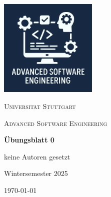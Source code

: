 \providecommand{\BlattNr}{0}
\providecommand{\AuthorsNames}{keine Autoren gesetzt}

\begin{titlepage}
	\centering
	\includegraphics[width=0.35\textwidth]{../assets/icon_ase.png}\par\vspace{1cm}
	{\scshape\LARGE Universität Stuttgart \par}
	\vspace{1cm}
	{\scshape\Large Advanced Software Engineering\par}
	\vspace{1.5cm}
	{\huge\bfseries Übungsblatt \BlattNr \par}
	\vspace{2cm}
	{\Large \AuthorsNames \par}
	\vfill
    Wintersemester 2025
    \vfill
	{\large \today\par}
\end{titlepage}
